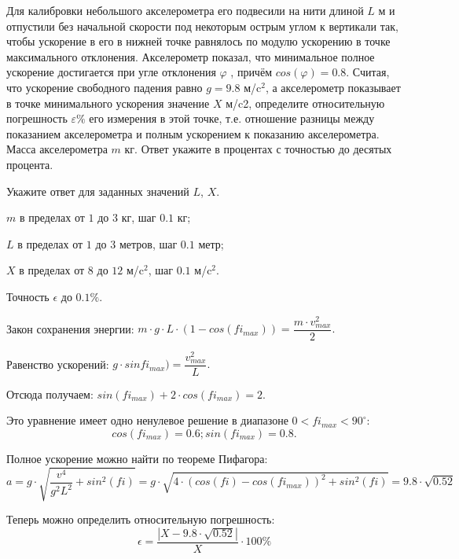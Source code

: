 
Для калибровки небольшого акселерометра его подвесили на нити длиной $L$ м и отпустили без начальной
скорости под некоторым острым углом к вертикали так, чтобы ускорение в его в
нижней точке равнялось по модулю ускорению в точке максимального отклонения.
Акселерометр показал, что минимальное полное ускорение достигается при угле
отклонения $\varphi$ , причём $cos(\varphi) = 0.8$. Считая, что
ускорение свободного падения равно $g = 9.8$  м/c$^2$, а акселерометр показывает в точке минимального
ускорения значение $X$  м/c2, определите относительную
погрешность $\varepsilon\%$  его измерения в этой
точке, т.е. отношение разницы между показанием акселерометра и 
полным ускорением к показанию акселерометра. Масса акселерометра $m$  кг. Ответ укажите в процентах с точностью до десятых
процента.

Укажите ответ для заданных значений $L$, $X$.

\paramSection

$m$ в пределах от $1$ до $3$ кг, шаг $0.1$ кг;  

$L$ в пределах от $1$ до $3$ метров, шаг $0.1$ метр;

$X$ в пределах от $8$ до $12$ м/c$^2$,  шаг $0.1$ м/c$^2$. 

Точность $\epsilon$ до $0.1 \%$.

\solutionSection

Закон сохранения энергии: $m \cdot g \cdot L \cdot (1-cos(fi_{max} ) )=\dfrac{m \cdot v_{max}^2}{2}.$

Равенство ускорений: $g \cdot sinfi_{max})=\dfrac{v_{max}^2}{L}.$

Отсюда получаем: $sin(fi_{max})+2 \cdot cos(fi_{max} )=2.$

Это уравнение имеет одно ненулевое решение в диапазоне $0 < fi_{max} < 90^{\circ}$:
 $$cos(fi_{max})=0.6;  sin(fi_{max} )=0.8.$$

Полное ускорение можно найти по теореме Пифагора:
$$a=g \cdot \sqrt{\dfrac{v^4}{g^2 L^2} +sin^2(fi)}=g \cdot \sqrt{4 \cdot (cos(fi)-cos(fi_{max}))^2+sin^2(fi)}= 9.8 \cdot \sqrt{0.52}$$

Теперь можно определить относительную погрешность:
$$\epsilon =\dfrac{|X-9.8 \cdot \sqrt{0.52}|}{X} \cdot 100 \% $$


